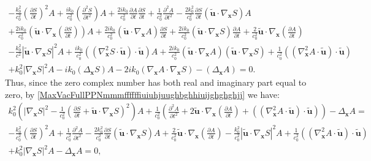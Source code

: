 \documentclass{article}
\theoremstyle{definition}
\theoremstyle{remark}
\renewcommand{\vec}[1]{\mathbf{#1}}
\newcommand{\er}{\eqref}
\newcommand{\er}{\eqref}
\begin{document}
\begin{multline}\label{MaxVacFullPPNmmmffffffiuiuhjuughbghhiuijghghghjj}
-\frac{k^2_0}{c^2_0}\left(\frac{\partial S}{\partial
t}\right)^2A+\frac{ik_0}{c^2_0}\left(\frac{\partial^2 S}{\partial
t^2}\right)A+\frac{2ik_0}{c^2_0}\frac{\partial A}{\partial
t}\frac{\partial S}{\partial t}+\frac{1}{c^2_0}\frac{\partial^2
A}{\partial t^2}-\frac{2k^2_0}{c^2_0}\frac{\partial S}{\partial
t}\left(\vec {\tilde u}\cdot\nabla_{\vec x}S\right)A\\+\frac{2ik_0
}{c^2_0}\left(\vec {\tilde u}\cdot \nabla_{\vec
x}\left(\frac{\partial S}{\partial
t}\right)\right)A+\frac{2ik_0}{c^2_0}\left(\vec {\tilde
u}\cdot\nabla_{\vec x}A\right)\frac{\partial S}{\partial
t}+\frac{2ik_0}{c^2_0}\left(\vec {\tilde u}\cdot\nabla_{\vec
x}S\right)\frac{\partial A}{\partial t}+\frac{2}{c^2_0}\vec {\tilde
u}\cdot\nabla_{\vec x}\left(\frac{\partial A}{\partial
t}\right)\\-\frac{k^2_0}{c^2}\left|\vec {\tilde u}\cdot\nabla_{\vec
x}S\right|^2A+\frac{ik_0}{c^2_0}\left(\left(\nabla^2_{\vec
x}S\cdot\vec {\tilde u}\right)\cdot\vec {\tilde
u}\right)A+\frac{2ik_0}{c^2_0}\left(\vec {\tilde u}\cdot\nabla_{\vec
x}A\right)\left(\vec {\tilde u}\cdot\nabla_{\vec
x}S\right)+\frac{1}{c^2_0}\left(\left(\nabla^2_{\vec x}A\cdot\vec
{\tilde u}\right)\cdot\vec {\tilde
u}\right)\\+k^2_0\left|\nabla_{\vec
x}S\right|^2A-ik_0\left(\Delta_{\vec
x}S\right)A-2ik_0\left(\nabla_{\vec x}A\cdot\nabla_{\vec
x}S\right)-\left(\Delta_{\vec x}A\right)=0.
\end{multline}
Thus, since the zero complex number has both real and imaginary part
equal to zero, by
\er{MaxVacFullPPNmmmffffffiuiuhjuughbghhiuijghghghjj} we have:
\begin{multline}\label{MaxVacFullPPNmmmffffffiuiuhjuughbghhiuijghghghhjhjhjj}
k^2_0\left(\left|\nabla_{\vec
x}S\right|^2-\frac{1}{c^2_0}\left(\frac{\partial S}{\partial t}+\vec
{\tilde u}\cdot\nabla_\vec x
S\right)^2\right)A+\frac{1}{c^2_0}\left(\frac{\partial^2 A}{\partial
t^2}+2\vec {\tilde u}\cdot\nabla_{\vec x}\left(\frac{\partial
A}{\partial t}\right)+\left(\left(\nabla^2_{\vec x}A\cdot\vec
{\tilde u}\right)\cdot\vec {\tilde u}\right)\right)-\Delta_{\vec
x}A=
%
%
%
\\-\frac{k^2_0}{c^2_0}\left(\frac{\partial S}{\partial
t}\right)^2A+\frac{1}{c^2_0}\frac{\partial^2 A}{\partial t^2}
-\frac{2k^2_0}{c^2_0}\frac{\partial S}{\partial t}\left(\vec {\tilde
u}\cdot\nabla_{\vec x}S\right)A+\frac{2}{c^2_0}\vec {\tilde
u}\cdot\nabla_{\vec x}\left(\frac{\partial A}{\partial
t}\right)-\frac{k^2_0}{c^2_0}\left|\vec {\tilde u}\cdot\nabla_{\vec
x}S\right|^2A+\frac{1}{c^2_0}\left(\left(\nabla^2_{\vec x}A\cdot\vec
{\tilde u}\right)\cdot\vec {\tilde
u}\right)\\+k^2_0\left|\nabla_{\vec x}S\right|^2A-\Delta_{\vec
x}A=0,
\end{multline}
\end{document}
